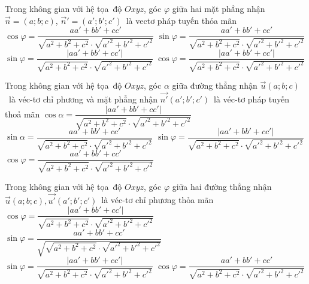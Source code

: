 \begin{ex}%
	Trong không gian với hệ tọa~độ $Oxyz$, góc $\varphi$ giữa hai mặt phẳng nhận $\overrightarrow{n}=\left(a;b;c \right)$,  $\overrightarrow{n}'=\left(a';b';c' \right)$~là vectơ pháp tuyến thỏa mãn
	 \choice
		{$\cos  \varphi =\dfrac{aa'+bb'+cc'}{\sqrt{a^2+b^2+c^2}\cdot\sqrt{{{{a'}}^2}+{{{b'}}^2}+{{{c'}}^2}}}$}
		{$\sin \varphi =\dfrac{aa'+bb'+cc'}{\sqrt{a^2+b^2+c^2}\cdot\sqrt{{{{a'}}^2}+{{{b'}}^2}+{{{c'}}^2}}}$} 
		{$\sin \varphi =\dfrac{\left|  aa'+bb'+cc' \right|}{\sqrt{a^2+b^2+c^2}\cdot\sqrt{{{{a'}}^2}+{{{b'}}^2}+{{{c'}}^2}}}$}
		{\True $\cos \varphi =\dfrac{\left| aa'+bb'+cc' \right|}{\sqrt{a^2+b^2+c^2}\cdot\sqrt{{{{a'}}^2}+{{{b'}}^2}+{{{c'}}^2}}}$} 
\end{ex}

\begin{ex}%
	Trong không  gian với hệ tọa~độ $ Oxyz$, góc $\alpha $ giữa đường thẳng nhận ${\overrightarrow{u}}\left(a;b;c\right)$~là véc-tơ chỉ phương và mặt phẳng nhận $\overrightarrow{n'}\left(a';b';c'\right)$~là véc-tơ pháp tuyến thoả mãn
	 \choice
		 {$\cos \alpha=\dfrac{\left|aa'+bb'+cc'\right|}{\sqrt{a^2+b^2+c^2}\cdot\sqrt{a'^2+b'^2+c'^2}}$}
		 {$\sin\alpha=\dfrac{aa'+bb'+cc'}{\sqrt{a^2+b^2+c^2}\cdot\sqrt{a'^2+b'^2+c'^2}}$}
		{\True $\sin\varphi=\dfrac{\left|aa'+bb'+cc'\right|}{\sqrt{a^2+b^2+c^2}\cdot\sqrt{a'^2+b'^2+c'^2}}$} 
		{$\cos  \varphi=\dfrac{aa'+bb'+cc'}{\sqrt{a^2+b^2+c^2}\cdot\sqrt{a'^2+b'^2+c'^2}}$}
\end{ex}

\begin{ex}%
	Trong không gian với hệ tọa~độ $ Oxyz$, góc $\varphi $  giữa hai đường thẳng nhận ${\overrightarrow{u}}\left(a;b;c\right), \overrightarrow{u'}\left(a';b';c'\right)$~là véc-tơ chỉ phương thỏa mãn
	 \choice
		 {\True $\cos\varphi=\dfrac{\left|aa'+bb'+cc'\right|}{\sqrt{a^2+b^2+c^2}\cdot\sqrt{a'^2+b'^2+c'^2}}$}
		{$\sin\varphi=\dfrac{aa'+bb'+cc'}{\sqrt{{\sqrt{a^2+b^2+c^2}\cdot\sqrt{a'^2+b'^2+c'^2}}}}$} 
		{$\sin\varphi=\dfrac{\left|aa'+bb'+cc'\right|}{\sqrt{a^2+b^2+c^2}\cdot\sqrt{a'^2+b'^2+c'^2}}$} 
		{$\cos \varphi=\dfrac{aa'+bb'+cc'}{\sqrt{a^2+b^2+c^2}\cdot\sqrt{a'^2+b'^2+c'^2}}$} 
\end{ex}

